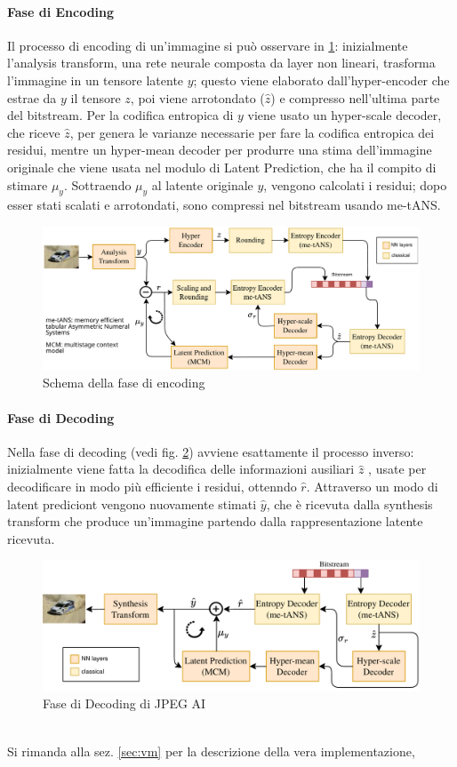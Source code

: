 \paragraph{Fase di Encoding}
Il processo di encoding di un'immagine si può osservare in \ref{fig:encodingJPEGAI}: inizialmente l'analysis transform, una rete neurale composta da layer non lineari, trasforma l'immagine in un tensore latente $y$; questo viene elaborato dall'hyper-encoder che estrae da $y$ il tensore $z$, poi viene arrotondato ($\hat{z}$) e compresso nell'ultima parte del bitstream. 
Per la codifica entropica di $y$  viene usato un hyper-scale decoder, che riceve $\hat{z}$,  per genera le varianze necessarie per fare la codifica entropica dei residui, mentre un hyper-mean decoder per produrre una stima dell'immagine originale che viene usata nel modulo di Latent Prediction, che ha il compito di stimare $\mu_y$.
Sottraendo $\mu_y$ al latente originale $y$, vengono calcolati i residui; dopo esser stati scalati e arrotondati, sono compressi nel bitstream usando me-tANS.\\
\begin{figure}
    \centering
    \includegraphics[width=1\linewidth]{img/encongdingJPEGAI.png}
    \caption{Schema della fase di encoding}
    \label{fig:encodingJPEGAI}
\end{figure}
\paragraph{Fase di Decoding}
Nella fase di decoding (vedi fig. \ref{fig:decodingJPEGAI}) avviene esattamente il processo inverso: inizialmente viene fatta la decodifica delle informazioni ausiliari $\hat{z}$ , usate per decodificare in modo più efficiente i residui, ottenndo $\hat{r}$. Attraverso un modo di latent prediciont vengono nuovamente stimati $\hat{y}$, che è ricevuta dalla synthesis transform che produce un'immagine partendo dalla rappresentazione latente ricevuta.
\begin{figure}
    \centering
    \includegraphics[width=1\linewidth]{img/decodingJPEGAI.png}
    \caption{Fase di Decoding di JPEG AI}
    \label{fig:decodingJPEGAI}
\end{figure}
\\
Si rimanda alla sez. \ref{sec:vm} per la descrizione della vera implementazione,
